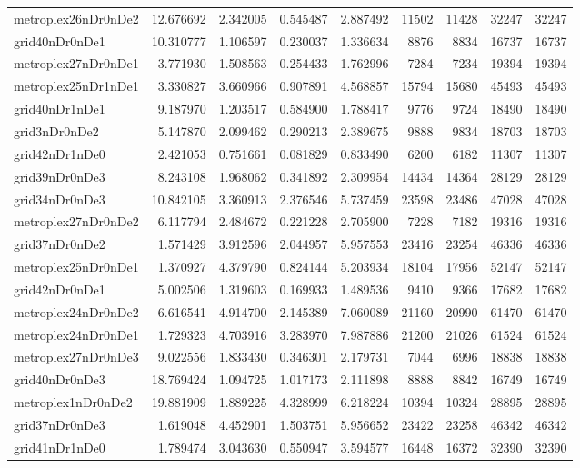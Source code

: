 \begin{longtable}{|l|r|r|r|r|r|r|r|r|}
metroplex26nDr0nDe2 & 12.676692 & 2.342005 & 0.545487 & 2.887492 & 11502 & 11428 & 32247 & 32247 \\
grid40nDr0nDe1 & 10.310777 & 1.106597 & 0.230037 & 1.336634 & 8876 & 8834 & 16737 & 16737 \\
metroplex27nDr0nDe1 & 3.771930 & 1.508563 & 0.254433 & 1.762996 & 7284 & 7234 & 19394 & 19394 \\
metroplex25nDr1nDe1 & 3.330827 & 3.660966 & 0.907891 & 4.568857 & 15794 & 15680 & 45493 & 45493 \\
grid40nDr1nDe1 & 9.187970 & 1.203517 & 0.584900 & 1.788417 & 9776 & 9724 & 18490 & 18490 \\
grid3nDr0nDe2 & 5.147870 & 2.099462 & 0.290213 & 2.389675 & 9888 & 9834 & 18703 & 18703 \\
grid42nDr1nDe0 & 2.421053 & 0.751661 & 0.081829 & 0.833490 & 6200 & 6182 & 11307 & 11307 \\
grid39nDr0nDe3 & 8.243108 & 1.968062 & 0.341892 & 2.309954 & 14434 & 14364 & 28129 & 28129 \\
grid34nDr0nDe3 & 10.842105 & 3.360913 & 2.376546 & 5.737459 & 23598 & 23486 & 47028 & 47028 \\
metroplex27nDr0nDe2 & 6.117794 & 2.484672 & 0.221228 & 2.705900 & 7228 & 7182 & 19316 & 19316 \\
grid37nDr0nDe2 & 1.571429 & 3.912596 & 2.044957 & 5.957553 & 23416 & 23254 & 46336 & 46336 \\
metroplex25nDr0nDe1 & 1.370927 & 4.379790 & 0.824144 & 5.203934 & 18104 & 17956 & 52147 & 52147 \\
grid42nDr0nDe1 & 5.002506 & 1.319603 & 0.169933 & 1.489536 & 9410 & 9366 & 17682 & 17682 \\
metroplex24nDr0nDe2 & 6.616541 & 4.914700 & 2.145389 & 7.060089 & 21160 & 20990 & 61470 & 61470 \\
metroplex24nDr0nDe1 & 1.729323 & 4.703916 & 3.283970 & 7.987886 & 21200 & 21026 & 61524 & 61524 \\
metroplex27nDr0nDe3 & 9.022556 & 1.833430 & 0.346301 & 2.179731 & 7044 & 6996 & 18838 & 18838 \\
grid40nDr0nDe3 & 18.769424 & 1.094725 & 1.017173 & 2.111898 & 8888 & 8842 & 16749 & 16749 \\
metroplex1nDr0nDe2 & 19.881909 & 1.889225 & 4.328999 & 6.218224 & 10394 & 10324 & 28895 & 28895 \\
grid37nDr0nDe3 & 1.619048 & 4.452901 & 1.503751 & 5.956652 & 23422 & 23258 & 46342 & 46342 \\
grid41nDr1nDe0 & 1.789474 & 3.043630 & 0.550947 & 3.594577 & 16448 & 16372 & 32390 & 32390 \\

\end{longtable}
